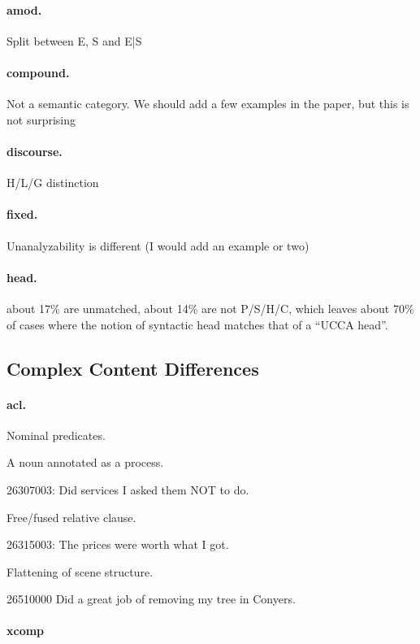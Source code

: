 \documentclass[11pt,a4paper]{article}
\begin{document}
\paragraph{amod.}
Split between E, S and E|S

\paragraph{compound.}
Not a semantic category. We should add a few examples in the paper, but this is not surprising

\paragraph{discourse.}
H/L/G distinction

\paragraph{fixed.}
Unanalyzability is different (I would add an example or two)

\paragraph{head.}
about 17\% are unmatched, about 14\% are not P/S/H/C, which
leaves about 70\% of cases where the notion of syntactic head matches
that of a ``UCCA head''.



\subsection{Complex Content Differences}

\paragraph{acl.}

Nominal predicates.

A noun annotated as a process.

26307003:
Did services I asked them NOT to do.

Free/fused relative clause.

26315003:
The prices were worth what I got.

Flattening of scene structure.

26510000
Did a great job of removing my tree in Conyers.

\paragraph{xcomp}
\end{document}
